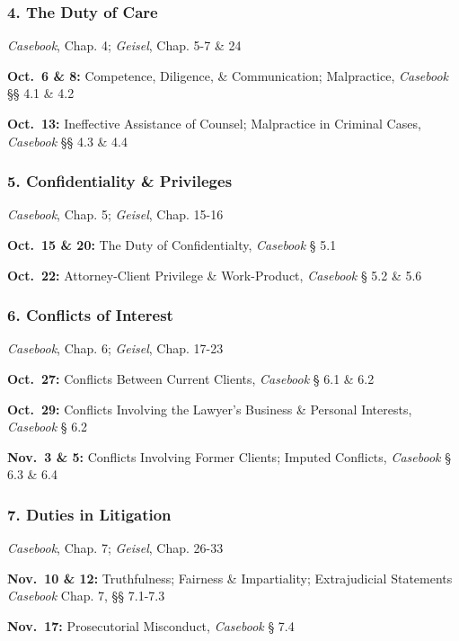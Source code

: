 \documentclass[11pt,letterpaper,twoside]{article}
\begin{document}
\subsubsection{4. The Duty of Care}\label{the-duty-of-care}

\emph{Casebook}, Chap. 4; \emph{Geisel}, Chap. 5-7 \& 24

\textbf{Oct.~6 \& 8:} Competence, Diligence, \& Communication;
Malpractice, \emph{Casebook} §§ 4.1 \& 4.2

\textbf{Oct.~13:} Ineffective Assistance of Counsel; Malpractice in
Criminal Cases, \emph{Casebook} §§ 4.3 \& 4.4

\subsubsection{5. Confidentiality \&
Privileges}\label{confidentiality-privileges}

\emph{Casebook}, Chap. 5; \emph{Geisel}, Chap. 15-16

\textbf{Oct.~15 \& 20:} The Duty of Confidentialty, \emph{Casebook} §
5.1

\textbf{Oct.~22:} Attorney-Client Privilege \& Work-Product,
\emph{Casebook} § 5.2 \& 5.6

\subsubsection{6. Conflicts of Interest}\label{conflicts-of-interest}

\emph{Casebook}, Chap. 6; \emph{Geisel}, Chap. 17-23

\textbf{Oct.~27:} Conflicts Between Current Clients, \emph{Casebook} §
6.1 \& 6.2

\textbf{Oct.~29:} Conflicts Involving the Lawyer's Business \& Personal
Interests, \emph{Casebook} § 6.2

\textbf{Nov.~3 \& 5:} Conflicts Involving Former Clients; Imputed
Conflicts, \emph{Casebook} § 6.3 \& 6.4

\subsubsection{7. Duties in Litigation}\label{duties-in-litigation}

\emph{Casebook}, Chap. 7; \emph{Geisel}, Chap. 26-33

\textbf{Nov.~10 \& 12:} Truthfulness; Fairness \& Impartiality;
Extrajudicial Statements \emph{Casebook} Chap. 7, §§ 7.1-7.3

\textbf{Nov.~17:} Prosecutorial Misconduct, \emph{Casebook} § 7.4
\end{document}
